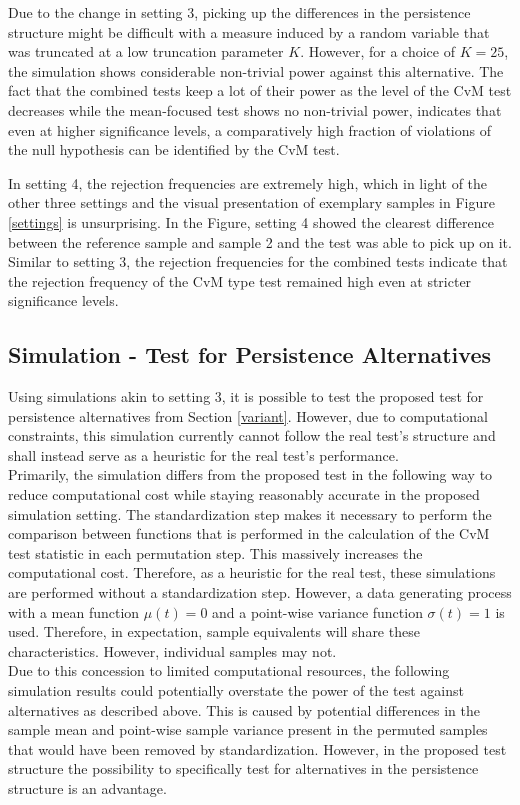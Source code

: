\documentclass[12pt, a4paper]{article}
\theoremstyle{MAstyle} \newtheorem{assumption}{Assumption}[section]
\theoremstyle{MAstyle} \newtheorem{definition}{Definition}[section]
\theoremstyle{MAstyle} \newtheorem{theorem}{Theorem}[section]
\begin{document}
		Due to the change in setting 3, picking up the differences in the persistence structure might be difficult with a measure induced by a random variable that was truncated at a low truncation parameter $K$. However, for a choice of $K = 25$, the simulation shows considerable non-trivial power against this alternative. The fact that the combined tests keep a lot of their power as the level of the CvM test decreases while the mean-focused test shows no non-trivial power, indicates that even at higher significance levels, a comparatively high fraction of violations of the null hypothesis can be identified by the CvM test.
		
		In setting 4, the rejection frequencies are extremely high, which in light of the other three settings and the visual presentation of exemplary samples in Figure \ref{settings} is unsurprising. In the Figure, setting 4 showed the clearest difference between the reference sample and sample 2 and the test was able to pick up on it. Similar to setting 3, the rejection frequencies for the combined tests indicate that the rejection frequency of the CvM type test remained high even at stricter significance levels.
	
		\subsection{Simulation - Test for Persistence Alternatives}\label{sim_persistence}
		Using simulations akin to setting 3, it is possible to test the proposed test for persistence alternatives from Section \ref{variant}. However, due to computational constraints, this simulation currently cannot follow the real test's structure and shall instead serve as a heuristic for the real test's performance. \\
		Primarily, the simulation differs from the proposed test in the following way to reduce computational cost while staying reasonably accurate in the proposed simulation setting. The standardization step makes it necessary to perform the comparison between functions that is performed in the calculation of the CvM test statistic in each permutation step. This massively increases the computational cost. Therefore, as a heuristic for the real test, these simulations are performed without a standardization step. However, a data generating process with a mean function $\mu(t) = 0$ and a point-wise variance function $\sigma(t) = 1$ is used. Therefore, in expectation, sample equivalents will share these characteristics. However, individual samples may not. \\
		Due to this concession to limited computational resources, the following simulation results could potentially overstate the power of the test against alternatives as described above. This is caused by potential differences in the sample mean and point-wise sample variance present in the permuted samples that would have been removed by standardization. 
		However, in the proposed test structure the possibility to specifically test for alternatives in the persistence structure is an advantage.\\
	
\end{document}
